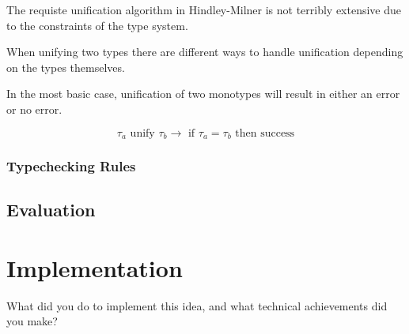 \documentclass{l4proj}
\begin{document}
The requiste unification algorithm in Hindley-Milner is not terribly extensive due to the constraints of the type system.

When unifying two types there are different ways to handle unification depending on the types themselves.

In the most basic case, unification of two monotypes will result in either an error or no error.

\[\tau_a \text{ unify } \tau_b \rightarrow \text{ if } \tau_a = \tau_b \text{ then success}\]


\subsection{Typechecking Rules}
\section{Evaluation}

\chapter{Implementation}
What did you do to implement this idea, and what technical achievements did you make?
\end{document}

